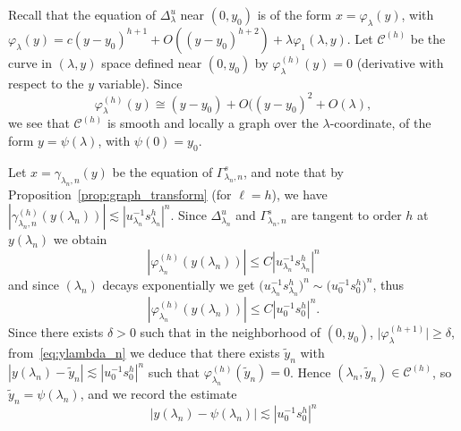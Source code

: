 \documentclass[11pt, oneside]{amsart}
\newcommand{\abs}[1]{\left\vert#1\right\vert}
\newcommand{\la}{\lambda}
\newcommand{\inv}{^{-1}}
\theoremstyle{remark}
\theoremstyle{definition}
\theoremstyle{theorem}
\newcommand{\commentaire}[1]{}
\begin{document}
Recall that the equation of $\Delta^u_\lambda$ near $(0, y_0)$ is of the form $x=\varphi_\lambda(y)$, with $\varphi_\lambda(y)  = c(y-y_0)^{h+1}+ O((y-y_0)^{h+2})+ \lambda \varphi_1(\lambda, y)$. Let 
$\mathcal C^{(h)}$ be the curve in $(\lambda, y)$ space defined near $(0, y_0)$ 
by $ \varphi_\lambda^{(h)}(y)   = 0$ (derivative with respect to the $y$ variable). Since 
\begin{equation}
 \varphi_\lambda^{(h)}(y)   \cong   (y-y_0) + O((y-y_0)^2 + O(\lambda),
 \end{equation}
  we see that $\mathcal C^{(h)}$ is smooth and  locally a graph over the $\lambda$-coordinate, of the form 
$y  = \psi(\lambda)$, with $\psi(0) = y_0$.  \commentaire{We do not define anymore the integer $q$ here, cf. Major Remark \#1}

Let $x= \gamma_{\lambda_n,n}(y)$ be the equation of $\Gamma^s_{\lambda_n, n}$, and
note that by Proposition~\ref{prop:graph_transform} (for $\ell=h$), we have 
$\abs{\gamma_{\lambda_n,n}^{(h)} (y(\lambda_n))}\lesssim  
\abs{u_{\lambda_n} \inv s_{\lambda_n}^{h}} ^n$. 
Since  $\Delta^u_{\lambda_n}$ and $\Gamma^s_{\lambda_n, n}$ are tangent to order $h$ 
at $y(\lambda_n)$ we obtain  
\begin{equation}
\abs{\varphi_{\lambda_n}^{(h)} (y(\lambda_n)) }\leq 
C \abs{u_{\lambda_n} \inv s_{\lambda_n}^{h}} ^n
\end{equation}
and since $(\lambda_n)$ decays exponentially we get 
  $\big( u_{\lambda_n}\inv  s_{\lambda_n}^{h}\big) ^n \sim \big(u_0 \inv  s_0^{h} \big)^n$, thus 
\begin{equation}\label{eq:ylambda_n}
\abs{\varphi_{\lambda_n}^{(h)} (y(\lambda_n)) }\leq 
C \abs{u_0 \inv s_0^{h}} ^n. 
\end{equation}
Since there exists $\delta>0$ such that  in the neighborhood of $(0,y_0)$, 
$\big\vert{\varphi_{\lambda}^{(h+1)}}\big\vert\geq \delta$, from~\eqref{eq:ylambda_n} we deduce 
 that there exists $\widetilde y_n$ with 
 $\abs{y(\lambda_n) - \widetilde y_n} \lesssim \abs{u_0 \inv s_0^{h}} ^n$   such that 
 $\varphi_{\lambda_n}^{(h)} (\widetilde y_n) =0$. Hence 
  $(\lambda_n , \widetilde y_n)\in \mathcal C^{(h)}$, 
  so $\widetilde y_n = \psi(\lambda_n)$,
 and we record the estimate
 \begin{equation}\label{eq:varphi_prime_lambda1}
 \abs{y(\lambda_n) - \psi(\lambda_n)} \lesssim \abs{u_0 \inv s_0^{h}} ^n
 \end{equation}
 
\end{document}
